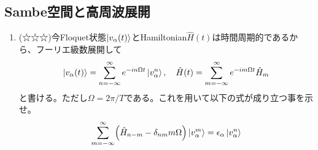 \documentclass[a4paper,12pt]{jsarticle}
\newcommand{\Biglrm}[1]{\Bigl( #1 \Bigr)}
\newcommand{\h}[1]{\hat{#1}}
\begin{document}
\subsection{Sambe空間と高周波展開}
\begin{enumerate}
  \item (☆☆☆)今Floquet状態$\ket{v_\alpha(t)}$とHamiltonian$\h{H}(t)$は時間周期的であるから、フーリエ級数展開して
\begin{eqnarray}
  \ket{v_\alpha(t)} = \sum_{n=-\infty}^\infty e^{-in\Omega t}\ket{v_\alpha^n}, \quad \h{H}(t) = \sum_{m=-\infty}^\infty e^{-im\Omega t}\h{H}_m
\end{eqnarray}
と書ける。ただし$\Omega = 2\pi/T$である。これを用いて以下の式が成り立つ事を示せ。
\begin{eqnarray}
  \sum_{m=-\infty}^\infty \Biglrm{\h{H}_{n-m} - \delta_{nm}m\Omega}\ket{v_\alpha^{m}} = \epsilon_\alpha \ket{v_\alpha^n} \label{eff_Floquet}
\end{eqnarray}


\end{enumerate}
\end{document}
